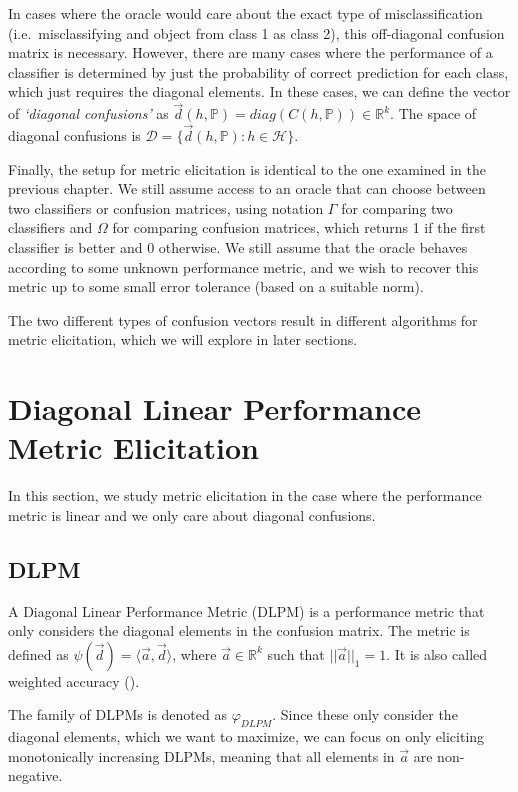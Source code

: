 \documentclass[
  letterpaper,
  DIV=11,
  numbers=noendperiod,
  oneside]{scrreprt}
\theoremstyle{remark}
\begin{document}
In cases where the oracle would care about the exact type of
misclassification (i.e.~misclassifying and object from class 1 as class
2), this off-diagonal confusion matrix is necessary. However, there are
many cases where the performance of a classifier is determined by just
the probability of correct prediction for each class, which just
requires the diagonal elements. In these cases, we can define the vector
of \emph{`diagonal confusions'} as
\(\vec{d}(h, \mathbb{P}) = \textit{diag}(C(h, \mathbb{P})) \in \mathbb{R}^k\).
The space of diagonal confusions is
\(\mathcal{D} = \{\vec{d}(h, \mathbb{P}) : h \in \mathcal{H}\}\).

Finally, the setup for metric elicitation is identical to the one
examined in the previous chapter. We still assume access to an oracle
that can choose between two classifiers or confusion matrices, using
notation \(\Gamma\) for comparing two classifiers and \(\Omega\) for
comparing confusion matrices, which returns 1 if the first classifier is
better and 0 otherwise. We still assume that the oracle behaves
according to some unknown performance metric, and we wish to recover
this metric up to some small error tolerance (based on a suitable norm).

The two different types of confusion vectors result in different
algorithms for metric elicitation, which we will explore in later
sections.

\section{Diagonal Linear Performance Metric
Elicitation}\label{diagonal-linear-performance-metric-elicitation}

In this section, we study metric elicitation in the case where the
performance metric is linear and we only care about diagonal confusions.

\subsection{DLPM}\label{dlpm}

A Diagonal Linear Performance Metric (DLPM) is a performance metric that
only considers the diagonal elements in the confusion matrix. The metric
is defined as \(\psi(\vec{d}) = \langle \vec{a}, \vec{d} \rangle\),
where \(\vec{a} \in \mathbb{R}^k\) such that \(||\vec{a}||_1 = 1\). It
is also called weighted accuracy
().

The family of DLPMs is denoted as \(\varphi_{DLPM}\). Since these only
consider the diagonal elements, which we want to maximize, we can focus
on only eliciting monotonically increasing DLPMs, meaning that all
elements in \(\vec{a}\) are non-negative.
\end{document}
